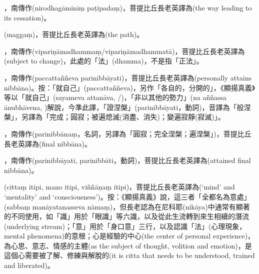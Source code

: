 \startitemgroup[noteitems]
\item{}，南傳作(nirodhagāminiṃ paṭipadaṃ)，菩提比丘長老英譯為(the way leading to its cessation)。
\item{}(maggaṃ)，菩提比丘長老英譯為(the path)。
\stopitemgroup

\startitemgroup[noteitems]
\item{}，南傳作(vipariṇāmadhammaṃ/vipariṇāmadhammatā)，菩提比丘長老英譯為(subject to change)，此處的「法」(dhamma)，不是指「正法」。
\stopitemgroup

\startitemgroup[noteitems]
\item{}，南傳作(paccattaññeva parinibbāyati)，菩提比丘長老英譯為(personally attains nibbāna)。按：「就自己」(paccattaññeva)，另作「各自的，分開的」，《顯揚真義》等以「就自己」(sayameva attanāva, /)，「非以其他的勢力」(na aññassa ānubhāvena, )解說，今準此譯，「證涅槃」(parinibbāyati，動詞)，音譯為「般涅槃」，另譯為「完成；圓寂；被遍熄滅(消盡、消失)；變遍寂靜(寂滅)」。
\stopitemgroup

\startitemgroup[noteitems]
\item{}，南傳作(parinibbānaṃ，名詞，另譯為「圓寂；完全涅槃；遍涅槃」)，菩提比丘長老英譯為(final nibbāna)。
\item{}，南傳作(parinibbāyati, parinibbāti，動詞)，菩提比丘長老英譯為(attained final nibbāna)。
\stopitemgroup

\startitemgroup[noteitems]
\item{}(cittaṃ itipi, mano itipi, viññāṇaṃ itipi)，菩提比丘長老英譯為(‘mind’ and ‘mentality’ and ‘consciousness’)。按：《顯揚真義》說，這三者「全都名為意處」(sabbaṃ manāyatanasseva nāmaṃ)，但長老認為在尼科耶(nikāya)中通常有顯著的不同使用，如「識」用於「眼識」等六識，以及從此生流轉到來生相續的潛流(underlying stream)；「意」用於「身口意」三行，以及認識「法」(心理現象，mental phenomena)的意根；心是經驗的中心(the center of personal experience)，為心思、意志、情感的主體(as the subject of thought, volition and emotion)，是這個心需要被了解、修練與解脫的(it is citta that needs to be understood, trained and liberated)。
\stopitemgroup

